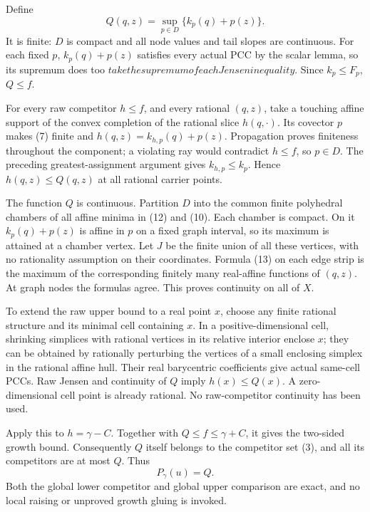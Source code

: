 \documentclass[
  11pt,
]{article}
\begin{document}
Define \[
 Q(q,z)=\sup_{p\in D}\{k_p(q)+p(z)\}.                                    \tag{13}
\] It is finite: \(D\) is compact and all node values and tail slopes
are continuous. For each fixed \(p\), \(k_p(q)+p(z)\) satisfies every
actual PCC by the scalar lemma, so its supremum does too
\(take the supremum of each Jensen inequality\). Since \(k_p\leq F_p\),
\(Q\leq f\).

For every raw competitor \(h\leq f\), and every rational \((q,z)\), take
a touching affine support of the convex completion of the rational slice
\(h(q,\cdot)\). Its covector \(p\) makes (7) finite and
\(h(q,z)=k_{h,p}(q)+p(z)\). Propagation proves finiteness throughout the
component; a violating ray would contradict \(h\leq f\), so \(p\in D\).
The preceding greatest-assignment argument gives \(k_{h,p}\leq k_p\).
Hence \(h(q,z)\leq Q(q,z)\) at all rational carrier points.

The function \(Q\) is continuous. Partition \(D\) into the common finite
polyhedral chambers of all affine minima in (12) and (10). Each chamber
is compact. On it \(k_p(q)+p(z)\) is affine in \(p\) on a fixed graph
interval, so its maximum is attained at a chamber vertex. Let \(J\) be
the finite union of all these vertices, with no rationality assumption
on their coordinates. Formula (13) on each edge strip is the maximum of
the corresponding finitely many real-affine functions of \((q,z)\). At
graph nodes the formulas agree. This proves continuity on all of \(X\).

To extend the raw upper bound to a real point \(x\), choose any finite
rational structure and its minimal cell containing \(x\). In a
positive-dimensional cell, shrinking simplices with rational vertices in
its relative interior enclose \(x\); they can be obtained by rationally
perturbing the vertices of a small enclosing simplex in the rational
affine hull. Their real barycentric coefficients give actual same-cell
PCCs. Raw Jensen and continuity of \(Q\) imply \(h(x)\leq Q(x)\). A
zero-dimensional cell point is already rational. No raw-competitor
continuity has been used.

Apply this to \(h=\gamma-C\). Together with \(Q\leq f\leq\gamma+C\), it
gives the two-sided growth bound. Consequently \(Q\) itself belongs to
the competitor set (3), and all its competitors are at most \(Q\). Thus
\[
                        P_\gamma(u)=Q.                                  \tag{14}
\] Both the global lower competitor and global upper comparison are
exact, and no local raising or unproved growth gluing is invoked.
\end{document}
